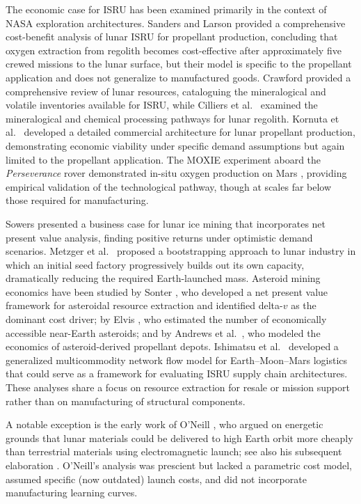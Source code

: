 \documentclass[preprint,12pt]{elsarticle}
\begin{document}
The economic case for ISRU has been examined primarily in the context of NASA exploration architectures. Sanders and Larson \cite{sanders2015} provided a comprehensive cost-benefit analysis of lunar ISRU for propellant production, concluding that oxygen extraction from regolith becomes cost-effective after approximately five crewed missions to the lunar surface, but their model is specific to the propellant application and does not generalize to manufactured goods. Crawford \cite{crawford2015} provided a comprehensive review of lunar resources, cataloguing the mineralogical and volatile inventories available for ISRU, while Cilliers et al.\ \cite{cilliers2023} examined the mineralogical and chemical processing pathways for lunar regolith. Kornuta et al.\ \cite{kornuta2019} developed a detailed commercial architecture for lunar propellant production, demonstrating economic viability under specific demand assumptions but again limited to the propellant application. The MOXIE experiment aboard the \textit{Perseverance} rover demonstrated in-situ oxygen production on Mars \cite{hecht2021}, providing empirical validation of the technological pathway, though at scales far below those required for manufacturing.

Sowers \cite{sowers2021} presented a business case for lunar ice mining that incorporates net present value analysis, finding positive returns under optimistic demand scenarios. Metzger et al.\ \cite{metzger2013} proposed a bootstrapping approach to lunar industry in which an initial seed factory progressively builds out its own capacity, dramatically reducing the required Earth-launched mass. Asteroid mining economics have been studied by Sonter \cite{sonter1997}, who developed a net present value framework for asteroidal resource extraction and identified delta-$v$ as the dominant cost driver; by Elvis \cite{elvis2012}, who estimated the number of economically accessible near-Earth asteroids; and by Andrews et al.\ \cite{andrews2015}, who modeled the economics of asteroid-derived propellant depots. Ishimatsu et al.\ \cite{ishimatsu2016} developed a generalized multicommodity network flow model for Earth--Moon--Mars logistics that could serve as a framework for evaluating ISRU supply chain architectures. These analyses share a focus on resource extraction for resale or mission support rather than on manufacturing of structural components.

A notable exception is the early work of O'Neill \cite{oneill1974}, who argued on energetic grounds that lunar materials could be delivered to high Earth orbit more cheaply than terrestrial materials using electromagnetic launch; see also his subsequent elaboration \cite{oneill1976}. O'Neill's analysis was prescient but lacked a parametric cost model, assumed specific (now outdated) launch costs, and did not incorporate manufacturing learning curves.
\end{document}

